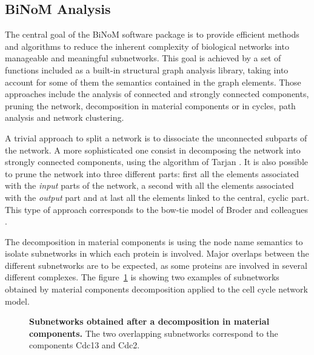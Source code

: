 \documentclass[10pt]{bmc_article}
\newenvironment{bmcformat}{\baselineskip20pt\sloppy\setboolean{publ}{false}}{\baselineskip20pt\sloppy}
\begin{document}
\begin{bmcformat}
\subsection*{BiNoM Analysis}
The central goal of the BiNoM software package is to provide efficient methods
and algorithms to reduce the inherent complexity of biological networks into
manageable and meaningful subnetworks. This goal is achieved by a set of
functions included as a built-in structural graph analysis library, taking into
account for some of them the semantics contained in the graph elements. Those
approaches include the analysis of connected and strongly connected components,
pruning the network, decomposition in material components or in cycles, path
analysis and network clustering.

A trivial approach to split a network is to dissociate the unconnected subparts
of the network. A more sophisticated one consist in decomposing the network into
strongly connected components, using the algorithm of Tarjan
\cite{tarjan1972depth}. It is also possible to prune the network into three different parts:
first all the elements associated with the \emph{input} parts of the network, a
second with all the elements associated with the \emph{output} part and at last
all the elements linked to the central, cyclic part. This type of approach
corresponds to the bow-tie model of Broder and colleagues \cite{broder2000graph}.

The decomposition in material components is using the node name semantics to
isolate subnetworks in which each protein is involved. Major overlaps between
the different subnetworks are to be expected, as some proteins are involved in
several different complexes. The figure~\ref{matcdc2cdc13} is showing two examples of subnetworks
obtained by material components decomposition applied to the cell cycle network
model.

\begin{figure}[h]
 \caption{\label{matcdc2cdc13}  \textbf{Subnetworks obtained after a decomposition in
material components.} The two overlapping subnetworks correspond to the components Cdc13 and
Cdc2.}
\end{figure}



\end{bmcformat}
\end{document}
